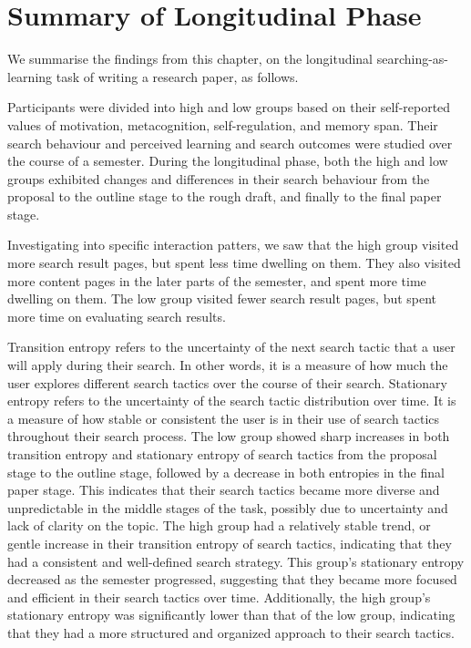 \documentclass[letterpaper, nobind]{templates/ociamthesis}
\begin{document}
\hypertarget{summary-of-longitudinal-phase}{%
\section{Summary of Longitudinal Phase}\label{summary-of-longitudinal-phase}}

We summarise the findings from this chapter, on the longitudinal searching-as-learning task of writing a research paper, as follows.

Participants were divided into high and low groups based on their self-reported values of motivation, metacognition, self-regulation, and memory span.
Their search behaviour and perceived learning and search outcomes were studied over the course of a semester.
During the longitudinal phase, both the high and low groups exhibited changes and differences in their search behaviour from the proposal to the outline stage to the rough draft, and finally to the final paper stage.

Investigating into specific interaction patters, we saw that the high group visited more search result pages, but spent less time dwelling on them. They also visited more content pages in the later parts of the semester, and spent more time dwelling on them.
The low group visited fewer search result pages, but spent more time on evaluating search results.

Transition entropy refers to the uncertainty of the next search tactic that a user will apply during their search.
In other words, it is a measure of how much the user explores different search tactics over the course of their search.
Stationary entropy refers to the uncertainty of the search tactic distribution over time.
It is a measure of how stable or consistent the user is in their use of search tactics throughout their search process.
The low group showed sharp increases in both transition entropy and stationary entropy of search tactics from the proposal stage to the outline stage, followed by a decrease in both entropies in the final paper stage.
This indicates that their search tactics became more diverse and unpredictable in the middle stages of the task, possibly due to uncertainty and lack of clarity on the topic.
The high group had a relatively stable trend, or gentle increase in their transition entropy of search tactics, indicating that they had a consistent and well-defined search strategy.
This group's stationary entropy decreased as the semester progressed, suggesting that they became more focused and efficient in their search tactics over time.
Additionally, the high group's stationary entropy was significantly lower than that of the low group, indicating that they had a more structured and organized approach to their search tactics.
\end{document}
